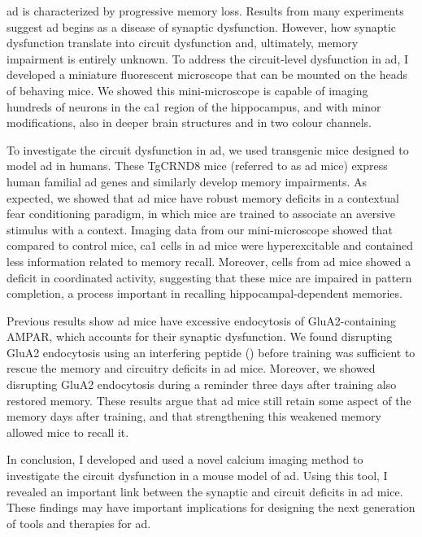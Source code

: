 \Gls{ad} is characterized by progressive memory loss. Results from many experiments suggest \gls{ad} begins as a disease of synaptic dysfunction. However, how synaptic dysfunction translate into circuit dysfunction and, ultimately, memory impairment is entirely unknown. To address the circuit-level dysfunction in \gls{ad}, I developed a miniature fluorescent microscope that can be mounted on the heads of behaving mice. We showed this mini-microscope is capable of imaging hundreds of neurons in the \gls{ca1} region of the hippocampus, and with minor modifications, also in deeper brain structures and in two colour channels. 

To investigate the circuit dysfunction in \gls{ad}, we used transgenic mice designed to model \gls{ad} in humans. These TgCRND8 mice (referred to as \gls{ad} mice) express human familial \gls{ad} genes and similarly develop memory impairments. As expected, we showed that \gls{ad} mice have robust memory deficits in a contextual fear conditioning paradigm, in which mice are trained to associate an aversive stimulus with a context. Imaging data from our mini-microscope showed that compared to control mice, \gls{ca1} cells in \gls{ad} mice were hyperexcitable and contained less information related to memory recall. Moreover, cells from \gls{ad} mice showed a deficit in coordinated activity, suggesting that these mice are impaired in pattern completion, a process important in recalling hippocampal-dependent memories.

Previous results show \gls{ad} mice have excessive endocytosis of GluA2-containing AMPAR, which accounts for their synaptic dysfunction. We found disrupting GluA2 endocytosis using an interfering peptide (\tglu{}) before training was sufficient to rescue the memory and circuitry deficits in \gls{ad} mice. Moreover, we showed disrupting GluA2 endocytosis during a reminder three days after training also restored memory. These results argue that \gls{ad} mice still retain some aspect of the memory days after training, and that strengthening this weakened memory allowed mice to recall it.

In conclusion, I developed and used a novel calcium imaging method to investigate the circuit dysfunction in a mouse model of \gls{ad}. Using this tool, I revealed an important link between the synaptic and circuit deficits in \gls{ad} mice. These findings may have important implications for designing the next generation of tools and therapies for \gls{ad}.
